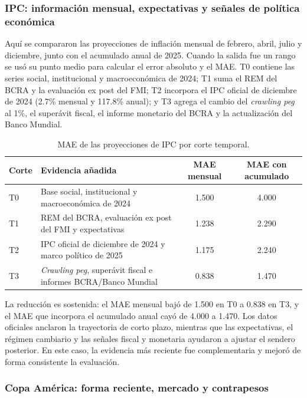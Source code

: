 \documentclass{article}
\begin{document}
\subsubsection{IPC: información mensual, expectativas y señales de política económica}

Aquí se compararon las proyecciones de inflación mensual de febrero, abril, julio y diciembre, junto con el acumulado anual de 2025. Cuando la salida fue un rango se usó su punto medio para calcular el error absoluto y el MAE. T0 contiene las series social, institucional y macroeconómica de 2024; T1 suma el REM del BCRA y la evaluación ex post del FMI; T2 incorpora el IPC oficial de diciembre de 2024 (2.7\% mensual y 117.8\% anual); y T3 agrega el cambio del \textit{crawling peg} al 1\%, el superávit fiscal, el informe monetario del BCRA y la actualización del Banco Mundial.

\begin{table}[H]
    \centering
    \small
    \begin{tabular}{@{}lp{7.1cm}cc@{}}
        \toprule
        \textbf{Corte} & \textbf{Evidencia añadida} & \textbf{MAE mensual} & \textbf{MAE con acumulado} \\ \midrule
        T0 & Base social, institucional y macroeconómica de 2024 & 1.500 & 4.000 \\
        T1 & REM del BCRA, evaluación ex post del FMI y expectativas & 1.238 & 2.290 \\
        T2 & IPC oficial de diciembre de 2024 y marco político de 2025 & 1.175 & 2.240 \\
        T3 & \textit{Crawling peg}, superávit fiscal e informes BCRA/Banco Mundial & 0.838 & 1.470 \\ \bottomrule
    \end{tabular}
    \caption{MAE de las proyecciones de IPC por corte temporal.}
    \label{tab:seed_ipc}
\end{table}

La reducción es sostenida: el MAE mensual bajó de 1.500 en T0 a 0.838 en T3, y el MAE que incorpora el acumulado anual cayó de 4.000 a 1.470. Los datos oficiales anclaron la trayectoria de corto plazo, mientras que las expectativas, el régimen cambiario y las señales fiscal y monetaria ayudaron a ajustar el sendero posterior. En este caso, la evidencia más reciente fue complementaria y mejoró de forma consistente la evaluación.

\subsubsection{Copa América: forma reciente, mercado y contrapesos}
\end{document}
